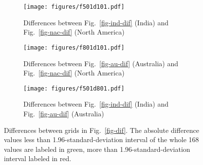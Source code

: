 \begin{figure*}
	\centering
	\begin{subfigure}{1.01\textwidth}
		\texttt{[image: figures/f501d101.pdf]}
		\caption{Differences between Fig.~\ref{fig-ind-dif} (India) and
		Fig.~\ref{fig-nac-dif} (North America)}\label{fig-i-n-dif}
	\end{subfigure}
	\vspace{.1em}
	\begin{subfigure}{1.01\textwidth}
		\texttt{[image: figures/f801d101.pdf]}
		\caption{Differences between Fig.~\ref{fig-au-dif} (Australia) and
		Fig.~\ref{fig-nac-dif} (North America)}\label{fig-a-n-dif}
	\end{subfigure}
	\vspace{.1em}
	\begin{subfigure}{1.01\textwidth}
		\texttt{[image: figures/f501d801.pdf]}
		\caption{Differences between Fig.~\ref{fig-ind-dif} (India) and
		Fig.~\ref{fig-au-dif} (Australia)}\label{fig-i-a-dif}
	\end{subfigure}
	\caption[Differences of differences of each plate's paleomagnetic
APWPs versus its FHM predicted APWP]{Differences between grids in
Fig.~\ref{fig-dif}. The absolute difference values less than
1.96-standard-deviation interval of the whole 168 values are labeled in green,
more than 1.96-standard-deviation interval labeled in red.}\label{fig-d-dif}
\end{figure*}

